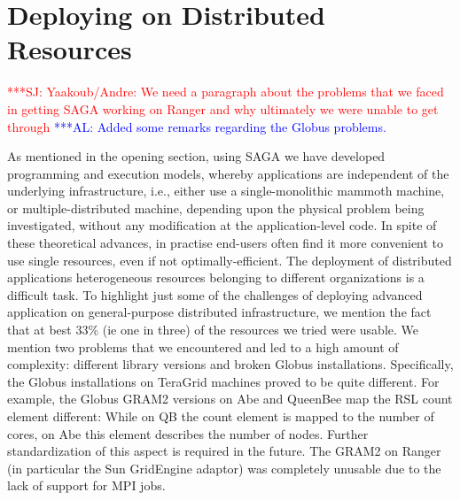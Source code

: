 \documentclass[conference,final]{IEEEtran}
\newcommand{\up}{\vspace*{-1em}}
\newcommand{\alnote}[1]{ {\textcolor{blue} { ***AL: #1 }}}
\newcommand{\jhanote}[1]{ {\textcolor{red} { ***SJ: #1 }}}
\newcommand{\alnote}[1]{}
\newcommand{\jhanote}[1]{}
\begin{document}
\up

\section{Deploying on Distributed Resources}

\up

\jhanote{Yaakoub/Andre: We need a paragraph about the problems that we
  faced in getting SAGA working on Ranger and why ultimately we were
  unable to get through} \alnote{Added some remarks regarding the
  Globus problems.}

As mentioned in the opening section, using SAGA we have developed
programming and execution models, whereby applications are independent
of the underlying infrastructure, i.e., either use a single-monolithic
mammoth machine, or multiple-distributed machine, depending upon the
physical problem being investigated, without any modification at the
application-level code. In spite of these theoretical advances, in
practise end-users often find it more convenient to use single
resources, even if not optimally-efficient.  The deployment of
distributed applications heterogeneous resources belonging to
different organizations is a difficult task.  To highlight just some
of the challenges of deploying advanced application on general-purpose
distributed infrastructure, we mention the fact that at best 33\% (ie
one in three) of the resources we tried were usable.  We mention two
problems that we encountered and led to a high amount of
complexity: different library versions and broken Globus
installations.
Specifically, the Globus installations on TeraGrid machines proved to be
quite different.  For example, the Globus GRAM2 versions on Abe and
QueenBee map the RSL count element different: While on QB the count
element is mapped to the number of cores, on Abe this element
describes the number of nodes. Further standardization of this aspect
is required in the future. The GRAM2 on Ranger (in particular the Sun
GridEngine adaptor) was completely unusable due to the lack of support
for MPI jobs.

\end{document}
